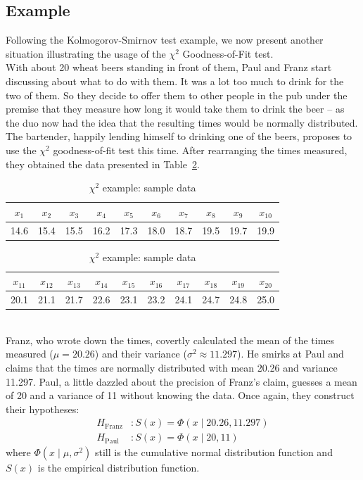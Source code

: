 \documentclass{article}
\newcommand{\reftbl}[1]{Table~\ref{#1}}
\begin{document}
\subsection{Example}
Following the Kolmogorov-Smirnov test example, we now present another situation illustrating the usage of the $\chi^2$ Goodness-of-Fit test.
\\
With about 20 wheat beers standing in front of them, Paul and Franz start discussing about what to do with them.
It was a lot too much to drink for the two of them.
So they decide to offer them to other people in the pub under the premise that they measure how long it would take them to drink the beer -- as the duo now had the idea that the resulting times would be normally distributed.
The bartender, happily lending himself to drinking one of the beers, proposes to use the $\chi^2$ goodness-of-fit test this time.
After rearranging the times measured, they obtained the data presented in \reftbl{tbl:chisqrawdata}.
%
\begin{table}[h]
\caption{$\chi^2$ example: sample data}
\label{tbl:chisqrawdata}
\center
\begin{tabular}{cccccccccc}
$x_1$	&$x_2$	&$x_3$	&$x_4$	&$x_5$	&$x_6$	&$x_7$	&$x_8$	&$x_9$	&$x_{10}$\\
\hline
14.6	&15.4	&15.5	&16.2	&17.3	&18.0	&18.7	&19.5	&19.7	&19.9	\\
\end{tabular}
\begin{tabular}{cccccccccc}
$x_{11}$	&$x_{12}$	&$x_{13}$	&$x_{14}$	&$x_{15}$	&$x_{16}$	&$x_{17}$	&$x_{18}$	&$x_{19}$	&$x_{20}$\\
\hline
20.1	&21.1	&21.7	&22.6	&23.1	&23.2	&24.1	&24.7	&24.8	&25.0	\\
\end{tabular}
\end{table}
\\
Franz, who wrote down the times, covertly calculated the mean of the times measured ($\mu = 20.26$) and their variance ($\sigma^2 \approx 11.297$).
He smirks at Paul and claims that the times are normally distributed with mean 20.26 and variance 11.297.
Paul, a little dazzled about the precision of Franz's claim, guesses a mean of 20 and a variance of 11 without knowing the data.
Once again, they construct their hypotheses:
\begin{align*}
	H_{\text{Franz}} &: S(x) = \Phi(x\mid 20.26, 11.297)
	\\
	H_{\text{Paul}} &: S(x) = \Phi(x\mid 20, 11)
\end{align*}
where $\Phi(x\mid\mu,\sigma^2)$ still is the cumulative normal distribution function and $S(x)$ is the empirical distribution function.
\end{document}

